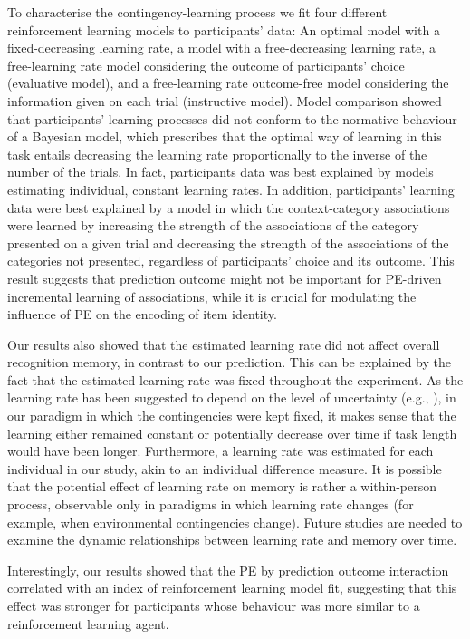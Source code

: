 \documentclass[a4paper,12pt]{article}
\begin{document}
To characterise the contingency-learning process we fit four different reinforcement learning models to participants' data: An optimal model with a fixed-decreasing learning rate, a model with a free-decreasing learning rate, a free-learning rate model considering the outcome of participants' choice (evaluative model), and a free-learning rate outcome-free model considering the information given on each trial (instructive model). Model comparison showed that participants' learning processes did not conform to the normative behaviour of a Bayesian model, which prescribes that the optimal way of learning in this task entails decreasing the learning rate proportionally to the inverse of the number of the trials. In fact, participants data was best explained by models estimating individual, constant learning rates. In addition, participants' learning data were best explained by a model in which the context-category associations were learned by increasing the strength of the associations of the category presented on a given trial and decreasing the strength of the associations of the categories not presented, regardless of participants' choice and its outcome. This result suggests that prediction outcome might not be important for PE-driven incremental learning of associations, while it is crucial for modulating the influence of PE on the encoding of item identity.  \par
Our results also showed that the estimated learning rate did not affect overall recognition memory, in contrast to our prediction. This can be explained by the fact that the estimated learning rate was fixed throughout the experiment. As the learning rate has been suggested to depend on the level of uncertainty (e.g., \citealp{Behrens2007}), in our paradigm in which the contingencies were kept fixed, it makes sense that the learning either remained constant or potentially decrease over time if task length would have been longer. Furthermore, a learning rate was estimated for each individual in our study, akin to an individual difference measure. It is possible that the potential effect of learning rate on memory is rather a within-person process, observable only in paradigms in which learning rate changes (for example, when environmental contingencies change). Future studies are needed to examine the dynamic relationships between learning rate and memory over time.   
\par
Interestingly, our results showed that the PE by prediction outcome interaction correlated with an index of reinforcement learning model fit, suggesting that this effect was stronger for participants whose behaviour was more similar to a reinforcement learning agent. 
\end{document}
